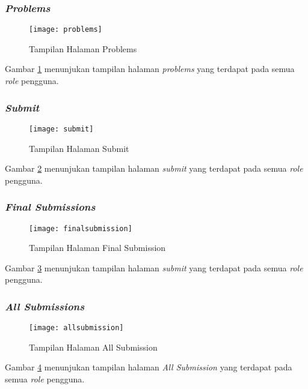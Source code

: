 \subsubsection{\textit{Problems}}
\begin{figure}[H]
	\centering  
	\texttt{[image: problems]}  
	\caption[Tampilan Halaman \textit{Problems}]{Tampilan Halaman Problems} 
	\label{fig:problems} 
\end{figure}

Gambar \ref{fig:problems} menunjukan tampilan halaman \textit{problems} yang terdapat pada semua \textit{role} pengguna.

\subsubsection{\textit{Submit}}
\begin{figure}[H]
	\centering  
	\texttt{[image: submit]}  
	\caption[Tampilan Halaman \textit{Submit}]{Tampilan Halaman Submit} 
	\label{fig:submit} 
\end{figure}

Gambar \ref{fig:submit} menunjukan tampilan halaman \textit{submit} yang terdapat pada semua \textit{role} pengguna.

\subsubsection{\textit{Final Submissions}}
\begin{figure}[H]
	\centering  
	\texttt{[image: finalsubmission]}  
	\caption[Tampilan Halaman \textit{Final Submission}]{Tampilan Halaman Final Submission} 
	\label{fig:finalsubmission} 
\end{figure}

Gambar \ref{fig:finalsubmission} menunjukan tampilan halaman \textit{submit} yang terdapat pada semua \textit{role} pengguna.
\subsubsection{\textit{All Submissions}}
\begin{figure}[H]
	\centering  
	\texttt{[image: allsubmission]}  
	\caption[Tampilan Halaman \textit{All Submission}]{Tampilan Halaman All Submission} 
	\label{fig:allsubmission} 
\end{figure}

Gambar \ref{fig:allsubmission} menunjukan tampilan halaman \textit{All Submission} yang terdapat pada semua \textit{role} pengguna.

